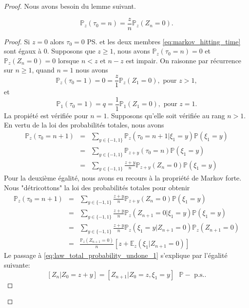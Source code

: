 \begin{proof}
Nous avons besoin du lemme suivant.
\begin{lemma}\label{lem:markov_hitting_time}
\begin{equation}\label{eq:markov_hitting_time}
\mathbb{P}_z(\tau_0 = n) = \frac{z}{n}\mathbb{P}_z(Z_n = 0).
\end{equation}
\end{lemma}
\begin{proof}
Si $z = 0$ alors $\tau_0 = 0$ \ps et les deux membres \eqref{eq:markov_hitting_time} sont égaux à $0$. Supposons que $z\geq1$, nous avons $\mathbb{P}_z(\tau_0 = n) = 0$ et $\mathbb{P}_z(Z_n = 0) = 0$ lorsque $n<z$ et $n-z$ est impair. On raisonne par récurrence sur $n\geq1$, quand $n = 1$ nous avons
$$
\mathbb{P}_z(\tau_0 = 1) = 0 = \frac{z}{1}\mathbb{P}_z(Z_1 = 0),\text{ pour }z>1, 
$$
et 
$$\mathbb{P}_1(\tau_0 = 1) = q = \frac{1}{1}\mathbb{P}_1(Z_1 = 0),\text{ pour }z=1. 
$$
La propiété est vérifiée pour $n=1$. Supposons qu'elle soit vérifiée au rang $n>1$. En vertu de la loi des probabilités totales, nous avons 
\begin{eqnarray*}
\mathbb{P}_z(\tau_0 = n+1)&=&\sum_{y\in\{-1,1\}}\mathbb{P}_z(\tau_0 = n+1|\xi_1 = y)\mathbb{P}(\xi_1 = y)\\
&=&\sum_{y\in\{-1,1\}}\mathbb{P}_{z+y}(\tau_0 = n)\mathbb{P}(\xi_1 = y)\\
&=&\sum_{y\in\{-1,1\}}\frac{z+y}{n}\mathbb{P}_{z+y}(Z_n = 0)\mathbb{P}(\xi_1 = y)
\end{eqnarray*}
Pour la deuxième égalité, nous avons eu recours à la propriété de Markov forte. Nous "détricottons" la loi des probabilités totales pour obtenir
\begin{eqnarray}
\mathbb{P}_z(\tau_0 = n+1)&=&\sum_{y\in\{-1,1\}}\frac{z+y}{n}\mathbb{P}_{z+y}(Z_n = 0)\mathbb{P}(\xi_1 = y)\nonumber\\
&=&\sum_{y\in\{-1,1\}}\frac{z+y}{n}\mathbb{P}_{z}(Z_{n+1} = 0|\xi_1 = y)\mathbb{P}(\xi_1 = y)\label{eq:law_total_probability_undone_1}\\
&=&\sum_{y\in\{-1,1\}}\frac{z+y}{n}\mathbb{P}_{z}(\xi_1 = y|Z_{n+1} = 0)\mathbb{P}_z(Z_{n+1} = 0)\nonumber\\
&=&\frac{\mathbb{P}_z(Z_{n+1} = 0)}{n}\left[z+\mathbb{E}_z(\xi_1|Z_{n+1}=0)\right]\label{eq:law_total_probability_undone_2}
\end{eqnarray}
Le passage à \eqref{eq:law_total_probability_undone_1} s'explique par l'égalité suivante: 
$$
[Z_n|Z_0 = z+y] = [Z_{n+1}|Z_0 = z, \xi_1 = y ]\text{ }\mathbb{P}-\text{ p.s.}.
$$
\end{proof}
\end{proof}
